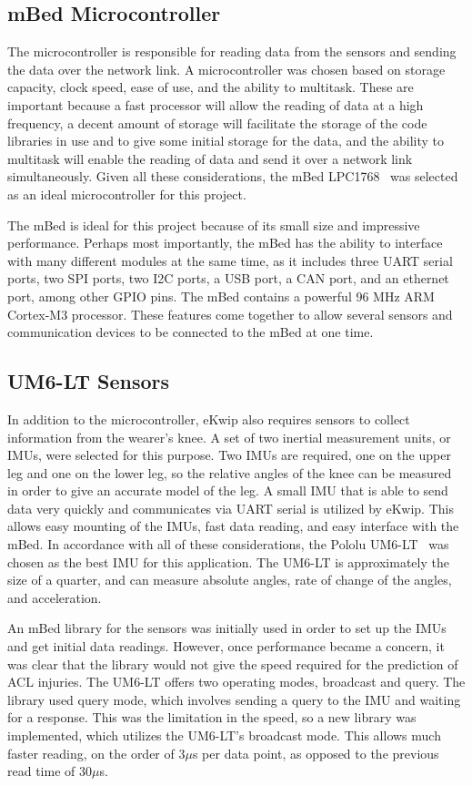 \subsection {mBed Microcontroller}
The microcontroller is responsible for reading data from the sensors and sending the data over the network link. A microcontroller was chosen based on storage capacity, clock speed, ease of use, and the ability to multitask. These are important because a fast processor will allow the reading of data at a high frequency, a decent amount of storage will facilitate the storage of the code libraries in use and to give some initial storage for the data, and the ability to multitask will enable the reading of data and send it over a network link simultaneously. Given all these considerations, the mBed LPC1768~\cite{mbed} was selected as an ideal microcontroller for this project.

The mBed is ideal for this project because of its small size and impressive performance. Perhaps most importantly, the mBed has the ability to interface with many different modules at the same time, as it includes three UART serial ports, two SPI ports, two I2C ports, a USB port, a CAN port, and an ethernet port, among other GPIO pins. The mBed contains a powerful 96 MHz ARM Cortex-M3 processor. These features come together to allow several sensors and communication devices to be connected to the mBed at one time.

\subsection {UM6-LT Sensors}
In addition to the microcontroller, eKwip also requires sensors to collect information from the wearer's knee. A set of two inertial measurement units, or IMUs, were selected for this purpose. Two IMUs are required, one on the upper leg and one on the lower leg, so the relative angles of the knee can be measured in order to give an accurate model of the leg. A small IMU that is able to send data very quickly and communicates via UART serial is utilized by eKwip. This allows easy mounting of the IMUs, fast data reading, and easy interface with the mBed. In accordance with all of these considerations, the Pololu UM6-LT~\cite{um6} was chosen as the best IMU for this application. The UM6-LT is approximately the size of a quarter, and can measure absolute angles, rate of change of the angles, and acceleration.

An mBed library for the sensors was initially used in order to set up the IMUs and get initial data readings. However, once performance became a concern, it was clear that the library would not give the speed required for the prediction of ACL injuries. The UM6-LT offers two operating modes, broadcast and query. The library used query mode, which involves sending a query to the IMU and waiting for a response. This was the limitation in the speed, so a new library was implemented, which utilizes the UM6-LT's broadcast mode. This allows much faster reading, on the order of 3$\mu$s per data point, as opposed to the previous read time of 30$\mu$s.

